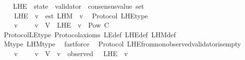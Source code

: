 \begin{isabellebody}
\endisatagproof
{\isafoldproof}%
%
\isadelimproof
\isanewline
%
\endisadelimproof
\ \ \isanewline
\isanewline
\isanewline
\isanewline
\isanewline
{}\isamarkupfalse%
\ L{\isacharunderscore}H{\isacharunderscore}E\ {\isacharcolon}{\isacharcolon}\ {\isachardoublequoteopen}state\ {\isasymRightarrow}\ validator\ {\isasymRightarrow}\ consensus{\isacharunderscore}value\ set{\isachardoublequoteclose}\isanewline
\ \ \isanewline
\ \ \ \ \isanewline
\ \ \ \ {\isachardoublequoteopen}L{\isacharunderscore}H{\isacharunderscore}E\ {\isasymsigma}\ v\ {\isacharequal}\ est\ {\isacharbackquote}L{\isacharunderscore}H{\isacharunderscore}M\ {\isasymsigma}\ v{\isachardoublequoteclose}\isanewline
\isanewline
{}\isamarkupfalse%
\ {\isacharparenleft}\ Protocol{\isacharparenright}\ L{\isacharunderscore}H{\isacharunderscore}E{\isacharunderscore}type\ {\isacharcolon}\isanewline
\ \ {\isachardoublequoteopen}{\isasymforall}\ {\isasymsigma}\ v{\isachardot}\ {\isasymsigma}\ {\isasymin}\ {\isasymSigma}\ {\isasymand}\ v\ {\isasymin}\ V\ {\isasymlongrightarrow}\ L{\isacharunderscore}H{\isacharunderscore}E\ {\isasymsigma}\ v\ {\isasymin}\ Pow\ C{\isachardoublequoteclose}\isanewline
%
\isadelimproof
\ \ %
\endisadelimproof
%
\isatagproof
{}\isamarkupfalse%
\ Protocol{\isachardot}L{\isacharunderscore}E{\isacharunderscore}type\ Protocol{\isacharunderscore}axioms\ L{\isacharunderscore}E{\isacharunderscore}def\ L{\isacharunderscore}H{\isacharunderscore}E{\isacharunderscore}def\ L{\isacharunderscore}H{\isacharunderscore}M{\isacharunderscore}def\ \isanewline
\ \ \isamarkupfalse%
\ M{\isacharunderscore}type\ L{\isacharunderscore}H{\isacharunderscore}M{\isacharunderscore}type\ \isamarkupfalse%
\ fastforce%
\endisatagproof
{\isafoldproof}%
%
\isadelimproof
\isanewline
%
\endisadelimproof
\isanewline
{}\isamarkupfalse%
\ {\isacharparenleft}\ Protocol{\isacharparenright}\ L{\isacharunderscore}H{\isacharunderscore}E{\isacharunderscore}from{\isacharunderscore}non{\isacharunderscore}observed{\isacharunderscore}validator{\isacharunderscore}is{\isacharunderscore}empty\ {\isacharcolon}\isanewline
\ \ {\isachardoublequoteopen}{\isasymforall}\ {\isasymsigma}\ v{\isachardot}\ {\isasymsigma}\ {\isasymin}\ {\isasymSigma}\ {\isasymand}\ v\ {\isasymin}\ V\ {\isasymand}\ v\ {\isasymnotin}\ observed\ {\isasymsigma}\ {\isasymlongrightarrow}\ L{\isacharunderscore}H{\isacharunderscore}E\ {\isasymsigma}\ v\ {\isacharequal}\ {\isasymemptyset}{\isachardoublequoteclose}\isanewline

\end{isabellebody}
